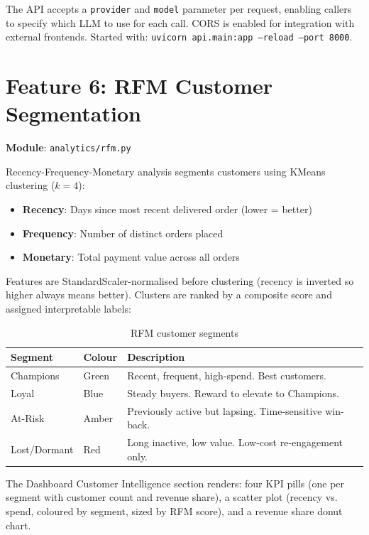 \documentclass[12pt,a4paper]{report}
\begin{document}
The API accepts a \texttt{provider} and \texttt{model} parameter per request, enabling callers
to specify which LLM to use for each call. CORS is enabled for integration with external
frontends. Started with: \texttt{uvicorn api.main:app --reload --port 8000}.

\section{Feature 6: RFM Customer Segmentation}

\textbf{Module}: \texttt{analytics/rfm.py}

Recency-Frequency-Monetary analysis segments customers using KMeans clustering ($k=4$):

\begin{itemize}
  \item \textbf{Recency}: Days since most recent delivered order (lower = better)
  \item \textbf{Frequency}: Number of distinct orders placed
  \item \textbf{Monetary}: Total payment value across all orders
\end{itemize}

Features are StandardScaler-normalised before clustering (recency is inverted so higher always
means better). Clusters are ranked by a composite score and assigned interpretable labels:

\begin{table}[H]
  \centering
  \caption{RFM customer segments}
  \label{tab:rfm}
  \renewcommand{\arraystretch}{1.3}
  \begin{tabular}{llp{8cm}}
    \toprule
    \textbf{Segment} & \textbf{Colour} & \textbf{Description} \\
    \midrule
    Champions    & \textcolor{AccentGreen}{Green}  & Recent, frequent, high-spend. Best customers. \\
    Loyal        & \textcolor{AccentBlue}{Blue}    & Steady buyers. Reward to elevate to Champions. \\
    At-Risk      & \textcolor{AccentAmber}{Amber}  & Previously active but lapsing. Time-sensitive win-back. \\
    Lost/Dormant & \textcolor{AccentRed}{Red}      & Long inactive, low value. Low-cost re-engagement only. \\
    \bottomrule
  \end{tabular}
\end{table}

The Dashboard Customer Intelligence section renders: four KPI pills (one per segment with
customer count and revenue share), a scatter plot (recency vs. spend, coloured by segment,
sized by RFM score), and a revenue share donut chart.
\end{document}
